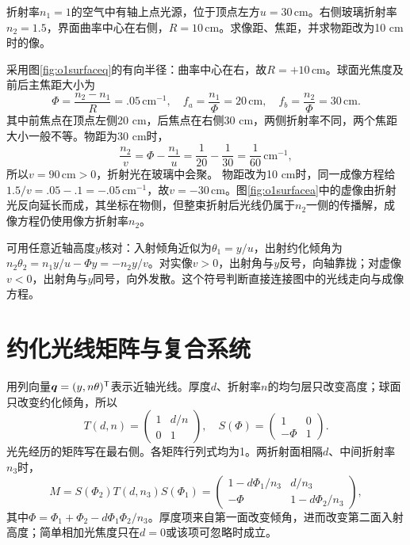 \begin{example}\label{ex:o1surface}
折射率$n_1=1$的空气中有轴上点光源，位于顶点左方$u=30\,\mathrm{cm}$。右侧玻璃折射率$n_2=1.5$，界面曲率中心在右侧，$R=10\,\mathrm{cm}$。求像距、焦距，并求物距改为10 cm时的像。
\end{example}
\begin{solution}
采用图\ref{fig:o1surfaceq}的有向半径：曲率中心在右，故$R=+10\,\mathrm{cm}$。球面光焦度及前后主焦距大小为
\[
 \Phi=\frac{n_2-n_1}R=.05\,\mathrm{cm}^{-1},\quad
 f_a=\frac{n_1}\Phi=20\,\mathrm{cm},\quad
 f_b=\frac{n_2}\Phi=30\,\mathrm{cm}.
\]
其中前焦点在顶点左侧20 cm，后焦点在右侧30 cm，两侧折射率不同，两个焦距大小一般不等。物距为30 cm时，
\[
 \frac{n_2}v=\Phi-\frac{n_1}u
 =\frac1{20}-\frac1{30}=\frac1{60}\,\mathrm{cm}^{-1},
\]
所以$v=90\,\mathrm{cm}>0$，折射光在玻璃中会聚。
物距改为10 cm时，同一成像方程给$1.5/v=.05-.1=-.05\,\mathrm{cm}^{-1}$，故$v=-30\,\mathrm{cm}$。图\ref{fig:o1surfacea}中的虚像由折射光反向延长而成，其坐标在物侧，但整束折射后光线仍属于$n_2$一侧的传播解，成像方程仍使用像方折射率$n_2$。

可用任意近轴高度$y$核对：入射倾角近似为$\theta_1=y/u$，出射约化倾角为$n_2\theta_2=n_1y/u-\Phi y=-n_2y/v$。对实像$v>0$，出射角与$y$反号，向轴靠拢；对虚像$v<0$，出射角与$y$同号，向外发散。这个符号判断直接连接图中的光线走向与成像方程。
\end{solution}

\section{约化光线矩阵与复合系统}\label{th:o1matrix}
用列向量$\bm{q}=(y,n\theta)^{\mathsf T}$表示近轴光线。厚度$d$、折射率$n$的均匀层只改变高度；球面只改变约化倾角，所以
\[
 T(d,n)=\begin{pmatrix}1&d/n\\0&1\end{pmatrix},\quad
 S(\Phi)=\begin{pmatrix}1&0\\-\Phi&1\end{pmatrix}.
\]
光先经历的矩阵写在最右侧。各矩阵行列式均为1。两折射面相隔$d$、中间折射率$n_3$时，
\[
 M=S(\Phi_2)T(d,n_3)S(\Phi_1)
 =\begin{pmatrix}1-d\Phi_1/n_3&d/n_3\\-\Phi&1-d\Phi_2/n_3\end{pmatrix},
\]
其中$\Phi=\Phi_1+\Phi_2-d\Phi_1\Phi_2/n_3$。厚度项来自第一面改变倾角，进而改变第二面入射高度；简单相加光焦度只在$d=0$或该项可忽略时成立。

